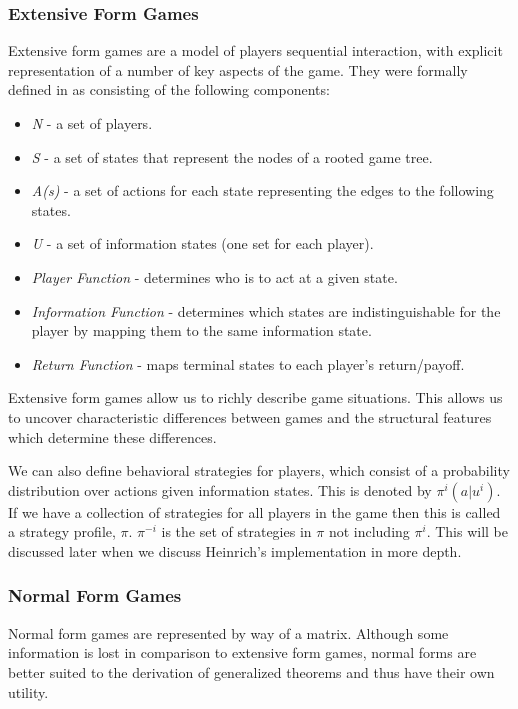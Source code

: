 \subsubsection{Extensive Form Games}
Extensive form games are a model of players sequential interaction, with explicit representation of a
number of key aspects of the game.
They were formally defined in\citep{kuhn2016extensive} as consisting of the following components:
\begin{itemize}
    \item \textit{N} - a set of players.
    \item \textit{S} - a set of states that represent the nodes of a rooted game tree.
    \item \textit{A(s)} - a set of actions for each state representing the edges to the following states.
    \item \textit{U} - a set of information states (one set for each player).
    \item \textit{Player Function} - determines who is to act at a given state.
    \item \textit{Information Function} - determines which states are indistinguishable for the player by mapping them to the same information state.
    \item \textit{Return Function} - maps terminal states to each player's return/payoff.
\end{itemize}

Extensive form games allow us to richly describe game situations.
This allows us to uncover characteristic differences between games and the structural features which
determine these differences\citep{kuhn2016extensive}.

We can also define behavioral strategies for players, which consist of a probability distribution over actions
given information states\citep{heinrich2017reinforcement}.
This is denoted by $\pi^i(a|u^i)$.
If we have a collection of strategies for all players in the game then this is called a strategy profile, $\pi$.
$\pi^{-i}$ is the set of strategies in $\pi$ not including $\pi^i$.
This will be discussed later when we discuss Heinrich's implementation in more depth.

\subsubsection{Normal Form Games}
Normal form games are represented by way of a matrix.
Although some information is lost in comparison to extensive form games, normal forms are
better suited to the derivation of generalized theorems\citep{kuhn2016extensive} and thus have their own utility.


